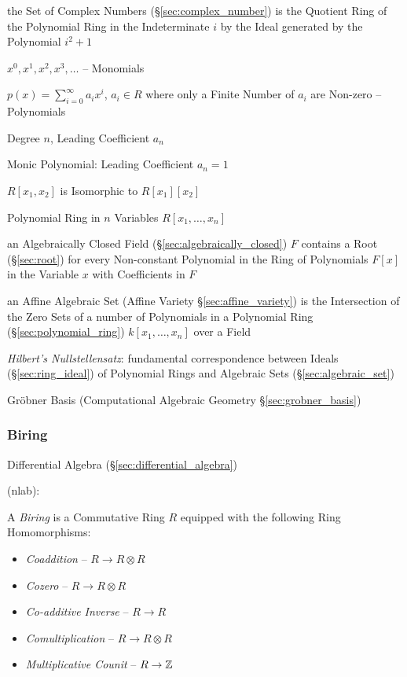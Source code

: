 the Set of Complex Numbers (\S\ref{sec:complex_number}) is the Quotient Ring of
the Polynomial Ring in the Indeterminate $i$ by the Ideal generated by the
Polynomial $i^2 + 1$

$x^0, x^1, x^2, x^3, \ldots$ -- Monomials

$p(x) = \sum_{i=0}^\infty a_i x^i$, $a_i \in R$ where only a Finite Number of
$a_i$ are Non-zero -- Polynomials

Degree $n$, Leading Coefficient $a_n$

Monic Polynomial: Leading Coefficient $a_n = 1$

$R[x_1, x_2]$ is Isomorphic to $R[x_1][x_2]$

Polynomial Ring in $n$ Variables $R[x_1, \ldots, x_n]$

an Algebraically Closed Field (\S\ref{sec:algebraically_closed}) $F$ contains a
Root (\S\ref{sec:root}) for every Non-constant Polynomial in the Ring
of Polynomials $F[x]$ in the Variable $x$ with Coefficients in $F$

an Affine Algebraic Set (Affine Variety \S\ref{sec:affine_variety}) is the
Intersection of the Zero Sets of a number of Polynomials in a Polynomial Ring
(\S\ref{sec:polynomial_ring}) $k[x_1,\ldots,x_n]$ over a Field

\emph{Hilbert's Nullstellensatz}: fundamental correspondence between Ideals
(\S\ref{sec:ring_ideal}) of Polynomial Rings and Algebraic Sets
(\S\ref{sec:algebraic_set})

\fist Gr\"obner Basis (Computational Algebraic Geometry
\S\ref{sec:grobner_basis})



\subsubsection{Biring}\label{sec:biring}

\fist Differential Algebra (\S\ref{sec:differential_algebra})

(nlab):

A \emph{Biring} is a Commutative Ring $R$ equipped with the following Ring
Homomorphisms:
\begin{itemize}
  \item \emph{Coaddition} -- $R \rightarrow R \otimes R$
  \item \emph{Cozero} -- $R \rightarrow R \otimes R$
  \item \emph{Co-additive Inverse} -- $R \rightarrow R$
  \item \emph{Comultiplication} -- $R \rightarrow R \otimes R$
  \item \emph{Multiplicative Counit} -- $R \rightarrow \mathbb{Z}$
\end{itemize}

